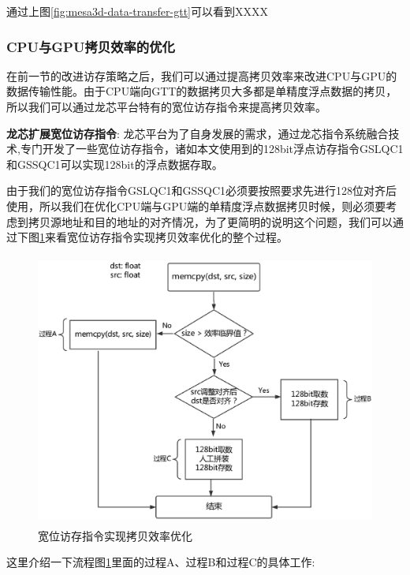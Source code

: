 通过上图\ref{fig:mesa3d-data-transfer-gtt}可以看到XXXX

\subsubsection{CPU与GPU拷贝效率的优化}

在前一节的改进访存策略之后，我们可以通过提高拷贝效率来改进CPU与GPU的数据传输性能。由于CPU端向GTT的数据拷贝大多都是单精度浮点数据的拷贝，所以我们可以通过龙芯平台特有的宽位访存指令来提高拷贝效率。

\textbf{龙芯扩展宽位访存指令}: 龙芯平台为了自身发展的需求，通过龙芯指令系统融合技术\cite{loongson-merge},专门开发了一些宽位访存指令，诸如本文使用到的128bit浮点访存指令GSLQC1和GSSQC1可以实现128bit的浮点数据存取。

由于我们的宽位访存指令GSLQC1和GSSQC1必须要按照要求先进行128位对齐后使用，所以我们在优化CPU端与GPU端的单精度浮点数据拷贝时候，则必须要考虑到拷贝源地址和目的地址的对齐情况，为了更简明的说明这个问题，我们可以通过下图\ref{fig:memcpy}来看宽位访存指令实现拷贝效率优化的整个过程。

\begin{figure}[H] 
  \centering
  \includegraphics[width=16cm,height=9cm]{figures/chap03/memcpy}
  \caption{宽位访存指令实现拷贝效率优化}
  \label{fig:memcpy}
\end{figure}

这里介绍一下流程图\ref{fig:memcpy}里面的过程A、过程B和过程C的具体工作:

